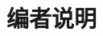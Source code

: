 \chapter*{编者说明}




\vspace{1em}
\makeatletter
\begin{flushright}
	\@author\\
	\@date
\end{flushright}
\makeatother


\cleardoublepage
\tableofcontents